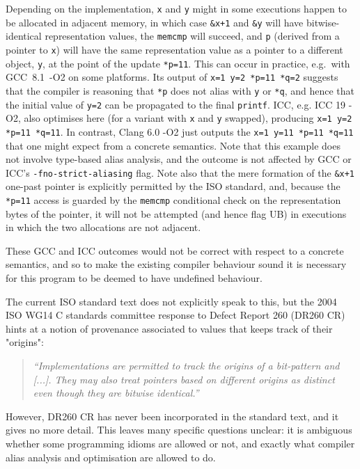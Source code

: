 \documentclass[acmsmall,review,screen]{acmart}\settopmatter{printfolios=true,printccs=false,printacmref=false}
\begin{document}
Depending on the implementation, 
 \lstinline{x} and \lstinline{y} might  in some executions
happen to be allocated in adjacent memory, in which case 
 \lstinline{&x+1} and \lstinline{&y} will have bitwise-identical representation values, the \lstinline{memcmp} will succeed, and
\lstinline{p} (derived from a pointer
to \lstinline{x}) will have the same
representation value as a pointer to a different object, \lstinline{y}, at the point of the
update \lstinline{*p=11}. This can occur in practice, e.g.~with \mbox{GCC
8.1 -O2} on some platforms. Its output of
%
\texttt{x=1 y=2 *p=11 *q=2}
%
suggests that the compiler is reasoning that \lstinline{*p} does not alias with \lstinline{y} or \lstinline{*q}, and
hence that the initial value of \lstinline{y=2} can be propagated to the
final \lstinline{printf}.
%
ICC, e.g. ICC 19 -O2, also optimises here
(for a variant with \texttt{x} and \texttt{y} swapped),  producing \texttt{x=1 y=2 *p=11 *q=11}.
In contrast, Clang 6.0 -O2 just outputs the 
\texttt{x=1 y=11 *p=11 *q=11} that one might expect from a concrete
semantics.
Note that this example does not involve type-based alias analysis, and
the outcome is not affected by GCC or ICC's \lstinline{-fno-strict-aliasing}
flag.
Note also that the mere formation of the \lstinline{&x+1} one-past pointer 
is explicitly permitted by the ISO standard, and, because the
\lstinline{*p=11} access
is guarded by the \lstinline{memcmp} conditional check on the representation bytes of the
pointer, it will not be attempted (and hence flag UB) in executions in
which the two allocations are not adjacent. 


These GCC and ICC outcomes would not be correct with respect to a concrete
semantics, and so to make the existing compiler behaviour sound it is necessary for this
program to be deemed to have undefined behaviour.
%



%
%
%
The current ISO standard text does not explicitly speak to this, but
the 2004 ISO WG14 C standards committee response to Defect Report
260 (DR260 CR)~\cite{dr260}
hints at a notion of provenance associated to values that
keeps track of their "origins":

\begin{quote}
\emph{``Implementations are permitted to track the origins of a
bit-pattern and [...]. They may also treat
pointers based on different origins as distinct even though they are
bitwise identical.''}

\end{quote}
However, DR260 CR has never been
incorporated in the standard text, and it gives no more detail.  This leaves many specific
questions unclear: it is ambiguous whether some programming idioms are allowed or
not, and exactly what compiler alias analysis and optimisation
are allowed to do.
\end{document}
